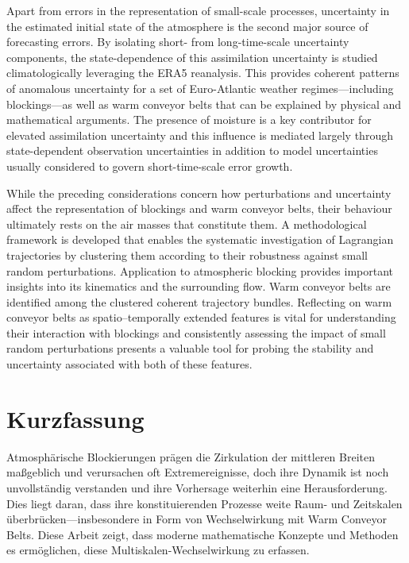 \begin{center}
Apart from errors in the representation of small-scale processes, uncertainty
in the estimated initial state of the atmosphere is the second major source of
forecasting errors. By isolating short- from
long-time-scale uncertainty components, the state-dependence of this
assimilation uncertainty is studied climatologically leveraging the ERA5
reanalysis. This provides coherent patterns of anomalous uncertainty for a set
of Euro-Atlantic weather regimes---including blockings---as well as warm
conveyor belts that can be explained by physical and mathematical arguments.
The presence of moisture is a key contributor for elevated assimilation uncertainty
and this influence is mediated largely through state-dependent observation
uncertainties in addition to model uncertainties usually considered to govern
short-time-scale error growth.

While the preceding considerations concern how perturbations and uncertainty
affect the representation of blockings and warm conveyor belts, their
behaviour ultimately rests on the air masses that constitute them. A
methodological framework is developed that enables the systematic
investigation of Lagrangian trajectories by clustering them according to
their robustness against small random perturbations. Application to
atmospheric blocking provides important insights into its kinematics and
the surrounding flow. Warm conveyor belts are identified
among the clustered coherent trajectory bundles. Reflecting on warm conveyor
belts as spatio--temporally extended features is vital for understanding
their interaction with blockings and consistently assessing the impact of
small random perturbations presents a valuable tool for probing the stability
and uncertainty associated with both of these features.
\cleardoublepage


\chapter*{Kurzfassung}

Atmosphärische Blockierungen prägen die Zirkulation der mittleren Breiten
maßgeblich und verursachen oft Extremereignisse, doch ihre
Dynamik ist noch unvollständig verstanden und ihre
Vorhersage weiterhin eine Herausforderung. Dies liegt daran, dass ihre
konstituierenden Prozesse weite Raum- und Zeitskalen
überbrücken---insbesondere in Form von Wechselwirkung mit Warm Conveyor Belts.
Diese Arbeit zeigt, dass moderne mathematische Konzepte und Methoden es
ermöglichen, diese Multiskalen-Wechselwirkung zu erfassen.


\end{center}
